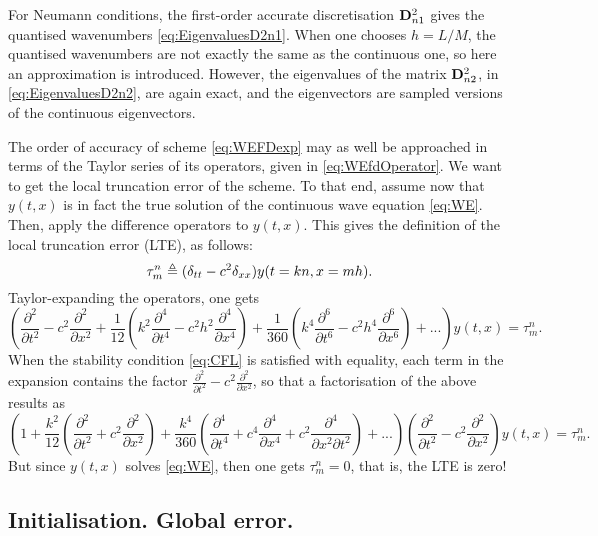 For Neumann conditions, the first-order accurate discretisation ${\bf D}^2_{n1}$ gives the quantised wavenumbers \eqref{eq:EigenvaluesD2n1}. When one chooses $h = L/M$, the quantised wavenumbers are not exactly the same as the continuous one, so here an approximation is introduced. However, the eigenvalues of the matrix ${\bf D}^2_{n2}$, in \eqref{eq:EigenvaluesD2n2}, are again exact, and the eigenvectors are sampled versions of the continuous eigenvectors.


The order of accuracy of scheme \eqref{eq:WEFDexp} may as well be approached in terms of the Taylor series of its operators, given in \eqref{eq:WEfdOperator}. We want to get the local truncation error of the scheme. To that end, assume now that $y(t,x)$ is in fact the true solution of the continuous wave equation \eqref{eq:WE}. Then, apply the difference operators to $y(t,x)$. This gives the definition of the local truncation error (LTE), as follows:
\begin{equation}
\tau^n_m \triangleq (\delta_{tt} - c^2 \delta_{xx})y(t=kn,x=mh).
\end{equation}
Taylor-expanding the operators, one gets
\begin{equation}
\left(\frac{\partial^2}{\partial t^2} - c^2 \frac{\partial^2}{\partial x^2} + \frac{1}{12}\left(k^2 \frac{\partial^4}{\partial t^4} - c^2 h^2 \frac{\partial^4}{\partial x^4}\right) + \frac{1}{360}\left(k^4 \frac{\partial^6}{\partial t^6} - c^2 h^4 \frac{\partial^6}{\partial x^6}\right) + ... \right)y(t,x) = \tau^n_m.
\end{equation}
When the stability condition \eqref{eq:CFL} is satisfied with equality, each term in the expansion contains the factor $\frac{\partial^2}{\partial t^2} - c^2 \frac{\partial^2}{\partial x^2}$, so that a factorisation of the above results as
\begin{equation}
\left(1 + \frac{k^2}{12}\left(\frac{\partial^2}{\partial t^2} + c^2 \frac{\partial^2}{\partial x^2}\right) + \frac{k^4}{360}\left( \frac{\partial^4}{\partial t^4} + c^4 \frac{\partial^4}{\partial x^4} +c^2 \frac{\partial^4}{\partial x^2 \partial t^2} \right) + ... \right)\left(\frac{\partial^2}{\partial t^2} - c^2 \frac{\partial^2}{\partial x^2}\right) y(t,x) = \tau^n_m.
\end{equation}
But since $y(t,x)$ solves \eqref{eq:WE}, then one gets $\tau^n_m=0$, that is, the LTE is zero!  




\subsection{Initialisation. Global error. }


